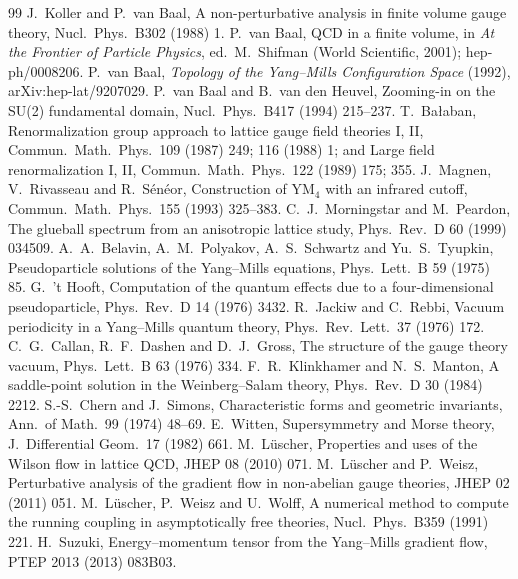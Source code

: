 \begin{thebibliography}{99}
 J.~Koller and P.~van Baal, A non-perturbative analysis in finite volume gauge theory, Nucl.\ Phys.\ B302 (1988) 1.
 P.~van Baal, QCD in a finite volume, in \emph{At the Frontier of Particle Physics}, ed.\ M.~Shifman (World Scientific, 2001); hep-ph/0008206.
 P.~van Baal, \emph{Topology of the Yang--Mills Configuration Space} (1992), arXiv:hep-lat/9207029.
 P.~van Baal and B.~van den Heuvel, Zooming-in on the SU(2) fundamental domain, Nucl.\ Phys.\ B417 (1994) 215--237.
 T.~Ba{\l}aban, Renormalization group approach to lattice gauge field theories I, II, Commun.\ Math.\ Phys.\ 109 (1987) 249; 116 (1988) 1; and Large field renormalization I, II, Commun.\ Math.\ Phys.\ 122 (1989) 175; 355.
 J.~Magnen, V.~Rivasseau and R.~S\'en\'eor, Construction of YM$_4$ with an infrared cutoff, Commun.\ Math.\ Phys.\ 155 (1993) 325--383.
 C.~J.~Morningstar and M.~Peardon, The glueball spectrum from an anisotropic lattice study, Phys.\ Rev.\ D 60 (1999) 034509.
 A.~A.~Belavin, A.~M.~Polyakov, A.~S.~Schwartz and Yu.~S.~Tyupkin, Pseudoparticle solutions of the Yang--Mills equations, Phys.\ Lett.\ B 59 (1975) 85.
 G.~'t Hooft, Computation of the quantum effects due to a four-dimensional pseudoparticle, Phys.\ Rev.\ D 14 (1976) 3432.
 R.~Jackiw and C.~Rebbi, Vacuum periodicity in a Yang--Mills quantum theory, Phys.\ Rev.\ Lett.\ 37 (1976) 172.
 C.~G.~Callan, R.~F.~Dashen and D.~J.~Gross, The structure of the gauge theory vacuum, Phys.\ Lett.\ B 63 (1976) 334.
 F.~R.~Klinkhamer and N.~S.~Manton, A saddle-point solution in the Weinberg--Salam theory, Phys.\ Rev.\ D 30 (1984) 2212.
 S.-S.~Chern and J.~Simons, Characteristic forms and geometric invariants, Ann.\ of Math.\ 99 (1974) 48--69.
 E.~Witten, Supersymmetry and Morse theory, J.\ Differential Geom.\ 17 (1982) 661.
 M.~L\"uscher, Properties and uses of the Wilson flow in lattice QCD, JHEP 08 (2010) 071.
 M.~L\"uscher and P.~Weisz, Perturbative analysis of the gradient flow in non-abelian gauge theories, JHEP 02 (2011) 051.
 M.~L\"uscher, P.~Weisz and U.~Wolff, A numerical method to compute the running coupling in asymptotically free theories, Nucl.\ Phys.\ B359 (1991) 221.
 H.~Suzuki, Energy--momentum tensor from the Yang--Mills gradient flow, PTEP 2013 (2013) 083B03.

\end{thebibliography}
